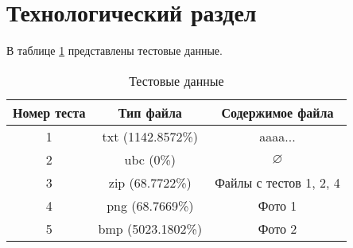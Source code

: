 \section{Технологический раздел}

В таблице \ref{tbl:test} представлены тестовые данные.

\begin{table}[H]
	\begin{center}
		\centering
		\caption{Тестовые данные}
		\label{tbl:test}
		\begin{tabular}{|c|c|c|} 
			
			\hline
			\multicolumn{1}{|c|}{Номер теста}
			&  \multicolumn{1}{c|}{Тип файла} &  \multicolumn{1}{c|}{Содержимое файла}\\
			\hline
			
			1& txt (1142.8572\%) &  {aaaa...} \\ \hline
			
			2& ubc (0\%) &  $\varnothing$\\ \hline
			
			3& zip (68.7722\%) & Файлы с тестов 1, 2, 4 \\ \hline
			
			4& png (68.7669\%) & {Фото 1} \\ \hline
			
			5& bmp (5023.1802\%) & {Фото 2} \\ \hline
			
			
		\end{tabular}
	\end{center}
\end{table}
